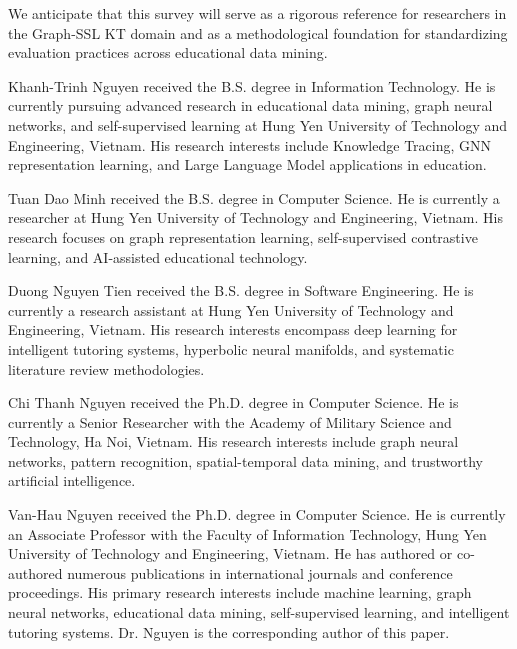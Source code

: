\documentclass[10pt,journal,compsoc]{IEEEtran}
\begin{document}
We anticipate that this survey will serve as a rigorous reference for researchers in the Graph-SSL KT domain and as a methodological foundation for standardizing evaluation practices across educational data mining.




\begin{IEEEbiographynophoto}{Khanh-Trinh Nguyen}
received the B.S. degree in Information Technology. He is currently pursuing advanced research in educational data mining, graph neural networks, and self-supervised learning at Hung Yen University of Technology and Engineering, Vietnam. His research interests include Knowledge Tracing, GNN representation learning, and Large Language Model applications in education.
\end{IEEEbiographynophoto}

\begin{IEEEbiographynophoto}{Tuan Dao Minh}
received the B.S. degree in Computer Science. He is currently a researcher at Hung Yen University of Technology and Engineering, Vietnam. His research focuses on graph representation learning, self-supervised contrastive learning, and AI-assisted educational technology.
\end{IEEEbiographynophoto}

\begin{IEEEbiographynophoto}{Duong Nguyen Tien}
received the B.S. degree in Software Engineering. He is currently a research assistant at Hung Yen University of Technology and Engineering, Vietnam. His research interests encompass deep learning for intelligent tutoring systems, hyperbolic neural manifolds, and systematic literature review methodologies.
\end{IEEEbiographynophoto}

\begin{IEEEbiographynophoto}{Chi Thanh Nguyen}
received the Ph.D. degree in Computer Science. He is currently a Senior Researcher with the Academy of Military Science and Technology, Ha Noi, Vietnam. His research interests include graph neural networks, pattern recognition, spatial-temporal data mining, and trustworthy artificial intelligence.
\end{IEEEbiographynophoto}

\begin{IEEEbiographynophoto}{Van-Hau Nguyen}
received the Ph.D. degree in Computer Science. He is currently an Associate Professor with the Faculty of Information Technology, Hung Yen University of Technology and Engineering, Vietnam. He has authored or co-authored numerous publications in international journals and conference proceedings. His primary research interests include machine learning, graph neural networks, educational data mining, self-supervised learning, and intelligent tutoring systems. Dr. Nguyen is the corresponding author of this paper.
\end{IEEEbiographynophoto}
\end{document}
